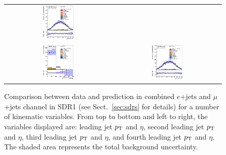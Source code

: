 \begin{figure}[htbp]
\begin{center}
\begin{tabular}{cc}
\includegraphics[width=0.30\textwidth]{appendices/figures/sdrs/JetEta3_ELEMUONCR5_1W_NOMINAL.eps} \\
\includegraphics[width=0.30\textwidth]{appendices/figures/sdrs/JetPt4_ELEMUONCR5_1W_NOMINAL.eps}  &
\includegraphics[width=0.30\textwidth]{appendices/figures/sdrs/JetEta4_ELEMUONCR5_1W_NOMINAL.eps}  \\
\end{tabular}\caption{\small {Comparison between data and prediction in combined $e$+jets and $\mu$+jets channel in SDR1 (see Sect.~\ref{sec:sdrs} for details) 
for a number of kinematic variables. From top to bottom and left to right, the variables displayed are: leading jet $\pt$ and $\eta$,  second leading jet $\pt$ and $\eta$,
third leading jet $\pt$ and $\eta$, and fourth leading jet $\pt$ and $\eta$. The shaded area represents the total background uncertainty.}}
\label{fig:ELEMUONCR5_2}
\end{center}
\end{figure}                                                                             


